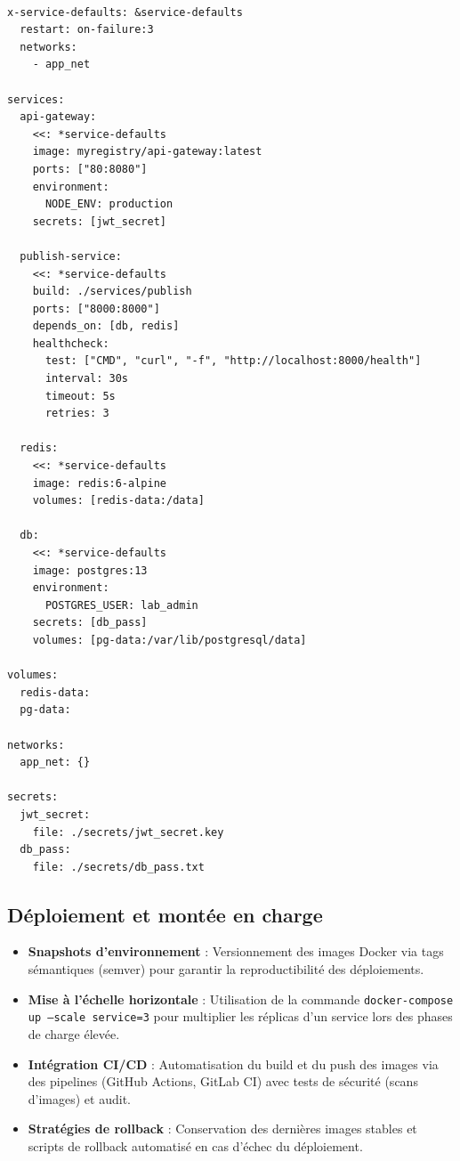\documentclass[12pt]{rapportPfe}
\begin{document}
\newpage
\begin{verbatim}

x-service-defaults: &service-defaults
  restart: on-failure:3
  networks:
    - app_net

services:
  api-gateway:
    <<: *service-defaults
    image: myregistry/api-gateway:latest
    ports: ["80:8080"]
    environment:
      NODE_ENV: production
    secrets: [jwt_secret]

  publish-service:
    <<: *service-defaults
    build: ./services/publish
    ports: ["8000:8000"]
    depends_on: [db, redis]
    healthcheck:
      test: ["CMD", "curl", "-f", "http://localhost:8000/health"]
      interval: 30s
      timeout: 5s
      retries: 3

  redis:
    <<: *service-defaults
    image: redis:6-alpine
    volumes: [redis-data:/data]

  db:
    <<: *service-defaults
    image: postgres:13
    environment:
      POSTGRES_USER: lab_admin
    secrets: [db_pass]
    volumes: [pg-data:/var/lib/postgresql/data]

volumes:
  redis-data:
  pg-data:

networks:
  app_net: {}
  
secrets:
  jwt_secret:
    file: ./secrets/jwt_secret.key
  db_pass:
    file: ./secrets/db_pass.txt
\end{verbatim}

\subsection{Déploiement et montée en charge}
\begin{itemize}[itemsep=0.8em]
  \item \textbf{Snapshots d’environnement} : Versionnement des images Docker via tags sémantiques (semver) pour garantir la reproductibilité des déploiements.
  \item \textbf{Mise à l’échelle horizontale} : Utilisation de la commande \texttt{docker-compose up --scale service=3} pour multiplier les réplicas d’un service lors des phases de charge élevée.
  \item \textbf{Intégration CI/CD} : Automatisation du build et du push des images via des pipelines (GitHub Actions, GitLab CI) avec tests de sécurité (scans d’images) et audit.
  \item \textbf{Stratégies de rollback} : Conservation des dernières images stables et scripts de rollback automatisé en cas d’échec du déploiement.
\end{itemize}
\end{document}
